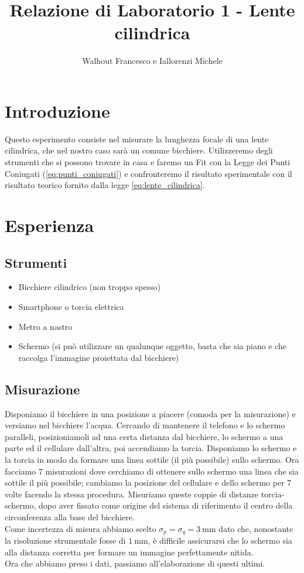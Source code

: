 \documentclass{article}
\title{Relazione di Laboratorio 1 - Lente cilindrica}
\author{Walhout Francesco e Iallorenzi Michele}
\begin{document}
\maketitle

\section{Introduzione}
    Questo esperimento consiste nel misurare la lunghezza focale di una lente cilindrica, che nel nostro caso sarà un comune bicchiere. Utilizzeremo degli strumenti che si possono trovare in casa e faremo un Fit con la Legge dei Punti Coniugati (\ref{eq:punti_coniugati}) e confronteremo il risultato sperimentale con il risultato teorico fornito dalla legge \ref{eq:lente_cilindrica}.



\section{Esperienza}

    \subsection{Strumenti}
    \begin{itemize}
        \item Bicchiere cilindrico (non troppo spesso)
        \item Smartphone o torcia elettrica
        \item Metro a nastro
        \item Schermo (si può utilizzare un qualunque oggetto, basta che sia piano e che raccolga l'immagine proiettata dal bicchiere)
    \end{itemize}

    \subsection{Misurazione}
    Disponiamo il bicchiere in una posizione a piacere (comoda per la misurazione) e versiamo nel bicchiere l'acqua. Cercando di mantenere il telefono e lo schermo paralleli, posizioniamoli ad una certa distanza dal bicchiere, lo schermo a una parte ed il cellulare dall'altra, poi accendiamo la torcia.
    Disponiamo lo schermo e la torcia in modo da formare una linea sottile (il più possibile) sullo schermo.
    Ora facciamo 7 misurazioni dove cerchiamo di ottenere sullo schermo una linea che sia sottile il più possibile; cambiamo la posizione del cellulare e dello schermo per 7 volte facendo la stessa procedura. Misuriamo queste coppie di distanze torcia-schermo, dopo aver fissato come origine del sistema di riferimento il centro della circonferenza alla base del bicchiere.\\
    Come incertezza di misura abbiamo scelto $\sigma_p = \sigma_q = \SI{3}{\mm}$ dato che, nonostante
    la risoluzione strumentale fosse di $\SI{1}{\mm}$, è difficile assicurarsi che lo schermo sia
    alla distanza corretta per formare un immagine perfettamente nitida.\\
    Ora che abbiamo preso i dati, passiamo all'elaborazione di questi ultimi.
\end{document}
